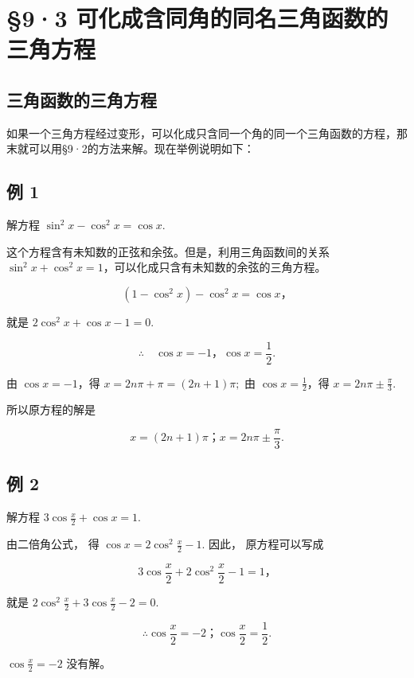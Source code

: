 \section{§9·3 可化成含同角的同名三角函数的三角方程}

\subsection{三角函数的三角方程}

如果一个三角方程经过变形，可以化成只含同一个角的同一个三角函数的方程，那末就可以用§9·2的方法来解。现在举例说明如下：

\subsection{例 1}

解方程 \(\sin^{2}x - \cos^{2}x = \cos x.\)

这个方程含有未知数的正弦和余弦。但是，利用三角函数间的关系
\(\sin^2 x + \cos^2 x = 1\)，可以化成只含有未知数的余弦的三角方程。

\[
(1 - \cos^ {2} x) - \cos^ {2} x = \cos x\text{，}
\]

就是 \(2\cos^2 x + \cos x - 1 = 0.\)

\[
\therefore \quad \cos x = - 1\text{，} \cos x = \frac {1}{2}.
\]

由 \(\cos x = -1\)，得 \(x = 2n\pi + \pi = (2n + 1)\pi;\) 由
\(\cos x = \frac{1}{2}\)，得 \(x = 2n\pi \pm \frac{\pi}{3}\).

所以原方程的解是

\[
x = (2 n + 1) \pi \text{；} x = 2 n \pi \pm \frac {\pi}{3}.
\]

\subsection{例 2}

解方程 \(3\cos \frac{x}{2} +\cos x = 1.\)

 由二倍角公式， 得 \(\cos x = 2\cos^2\frac{x}{2} - 1\).
因此， 原方程可以写成

\[
3 \cos \frac {x}{2} + 2 \cos^ {2} \frac {x}{2} - 1 = 1\text{，}
\]

就是 \(2\cos^2\frac{x}{2} + 3\cos \frac{x}{2} - 2 = 0.\)

\[
\therefore \cos \frac {x}{2} = - 2\text{；} \cos \frac {x}{2} = \frac {1}{2}.
\]

\(\cos \frac{x}{2} = -2\) 没有解。

